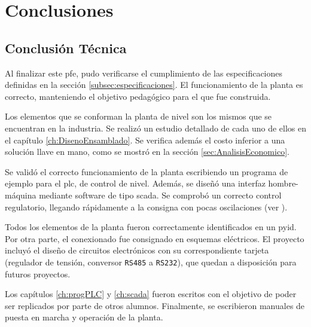 \chapter{Conclusiones}
\label{ch:conclusiones}

\section{Conclusión Técnica}
\label{sec:ConclusionTecnica}

Al finalizar este \gls{pfe}, pudo verificarse el cumplimiento de las
especificaciones definidas en la sección \ref{subsec:especificaciones}.
El funcionamiento de la planta es correcto, manteniendo el objetivo pedagógico
para el que fue construida.

Los elementos que se conforman la planta de nivel son los mismos que se
encuentran en la industria.
Se realizó un estudio detallado de cada uno de ellos en el capítulo
\ref{ch:DisenoEnsamblado}.
Se verifica además el costo inferior a una solución llave en mano, como se
mostró en la sección \ref{sec:AnalisisEconomico}.

Se validó el correcto funcionamiento de la planta escribiendo un programa de
ejemplo para el \gls{plc}, de control de nivel.
Además, se diseñó una interfaz hombre-máquina mediante software de tipo
\gls{scada}.
Se comprobó un correcto control regulatorio, llegando rápidamente a la consigna
con pocas oscilaciones (ver ).

Todos los elementos de la planta fueron correctamente identificados en un
\gls{pyid}.
Por otra parte, el conexionado fue consignado en esquemas eléctricos.
El proyecto incluyó el diseño de circuitos electrónicos con su correspondiente
tarjeta (regulador de tensión, conversor \verb|RS485| a \verb|RS232|), que
quedan a disposición para futuros proyectos.

Los capítulos \ref{ch:progPLC} y \ref{ch:scada} fueron escritos con el
objetivo de poder ser replicados por parte de otros alumnos.
Finalmente, se escribieron manuales de puesta en marcha y operación de la
planta.

